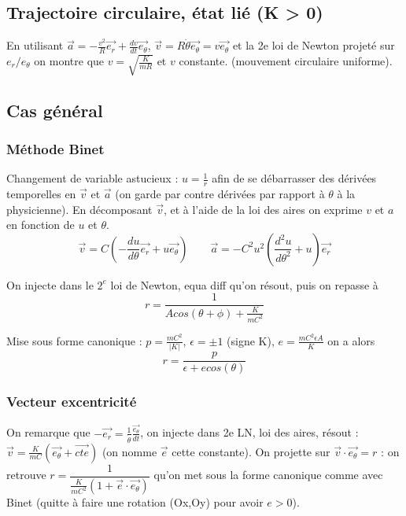 \documentclass[9pt]{article}
\begin{document}
\begin{multicols*}{2}
\subsection{Trajectoire circulaire, état lié (K > 0)}
En utilisant $\overrightarrow{a} = -\frac{v^2}{R}\overrightarrow{e_r} + \frac{dv}{dt}\overrightarrow{e_\theta}$, $\overrightarrow{v} = R \dot{\theta}\overrightarrow{e_\theta} = v \overrightarrow{e_\theta}$ et la 2e loi de Newton projeté sur $e_r/e_\theta$ on montre que $v = \sqrt{\frac{K}{mR}}$ et $v$ constante. (mouvement circulaire uniforme).

\subsection{Cas général}

\subsubsection{Méthode Binet}
Changement de variable astucieux : $u = \frac{1}{r}$ afin de se débarrasser des dérivées temporelles en $\overrightarrow{v}$ et $\overrightarrow{a}$ (on garde par contre dérivées par rapport à $\theta$ à la physicienne). En décomposant $\overrightarrow{v}$, et à l'aide de la loi des aires on exprime $v$ et $a$ en fonction de $u$ et $\theta$.
$$\overrightarrow{v} = C (-\frac{du}{d\theta}\overrightarrow{e_r} + u \overrightarrow{e_\theta}) \qquad \overrightarrow{a} = -C^2 u^2 (\frac{d^2 u}{d\theta^2} + u) \overrightarrow{e_r}$$

On injecte dans le $2^e$ loi de Newton, equa diff qu'on résout, puis on repasse à $$r = \frac{1}{A cos(\theta + \phi) + \frac{K}{mC^2}}$$

Mise sous forme canonique : $p = \frac{mC^2}{|K|}$, $\epsilon = \pm 1$ (signe K), $e=\frac{mC^2\epsilon A}{K}$ on a alors
$$r=\frac{p}{\epsilon + e cos(\theta)}$$

\subsubsection{Vecteur excentricité}
On remarque que $- \overrightarrow{e_r} = \frac{1}{\dot{\theta}} \frac{\overrightarrow{e_\theta}}{dt}$, on injecte dans 2e LN, loi des aires, résout : $\overrightarrow{v} = \frac{K}{mC}(\overrightarrow{e_\theta} + \overrightarrow{cte})$ (on nomme $\overrightarrow{e}$ cette constante). On projette sur $\overrightarrow{v} \cdot \overrightarrow{e_\theta} = r$ : on retrouve $r = \dfrac{1}{\frac{K}{mC^2}(1+\overrightarrow{e}\cdot \overrightarrow{e_\theta})}$ qu'on met sous la forme canonique comme avec Binet (quitte à faire une rotation (Ox,Oy) pour avoir $e > 0$).


\end{multicols*}
\end{document}
